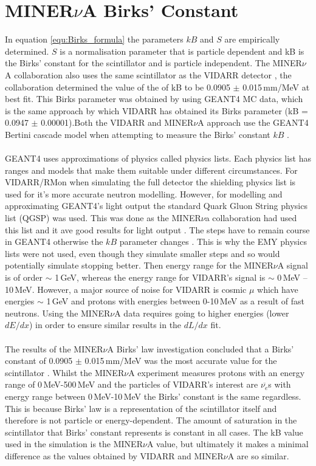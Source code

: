 \section{MINER$\nu$A Birks' Constant}\label{sec:GEANT4Simulation_MINERvABirksConstant}
In equation \ref{equ:Birks_formula} the parameters $kB$ and $S$ are empirically determined. $S$ is a normalisation parameter that is particle dependent and kB is the Birks' constant for the scintillator and is particle independent. The MINER$\nu$A collaboration \cite{aliaga_2015} also uses the same scintillator as the VIDARR detector \cite{aliaga_2014}, the collaboration determined the value of the of kB to be 0.0905 $\pm$ 0.015\,mm/MeV at best fit. This Birks parameter was obtained by using GEANT4 MC data, which is the same approach by which VIDARR has obtained its Birks parameter (kB = 0.0947 $\pm$ 0.00001).Both the VIDARR and MINER$\nu$A approach use the GEANT4 Bertini cascade model when attempting to measure the Birks' constant $kB$ \cite{Heikkinen_2003}. 
\\\\GEANT4 uses approximations of physics called physics lists. Each physics list has ranges and models that make them suitable under different circumstances. For VIDARR/RMon when simulating the full detector the shielding physics list is used for it's more accurate neutron modelling. However, for modelling and approximating GEANT4's light output the standard Quark Gluon String physics list (QGSP) was used. This was done as the MINER$\nu$a collaboration had used this list and it ave good results for light output \cite{Patrick_2018}. The steps have to remain course in GEANT4 otherwise the $kB$ parameter changes  \cite{aliaga_2015}. This is why the EMY physics lists were not used, even though they simulate smaller steps and so would potentially simulate stopping better. Then energy range for the MINER$\nu$A signal is of order $\sim$ 1\,GeV, whereas the energy range for VIDARR's signal is $\sim$ 0\,MeV -- 10\,MeV. However, a major source of noise for VIDARR is cosmic $\mu$ which have energies $\sim$ 1\,GeV and protons with energies between 0-10\,MeV as a result of fast neutrons. Using the MINER$\nu$A data requires going to higher energies (lower $dE/dx$) in order to ensure similar results in the $dL/dx$ fit.  
\\\\The results of the MINER$\nu$A Birks' law investigation concluded that a Birks' constant of 0.0905 $\pm$ 0.015\,mm/MeV was the most accurate value for the scintillator \cite{aliaga_2015}. Whilst the MINER$\nu$A experiment measures protons with an energy range of 0\,MeV-500\,MeV and the particles of VIDARR's interest are $\overline{\nu_{e}}$s with energy range between 0\,MeV-10\,MeV the Birks' constant is the same regardless. This is because Birks' law is a representation of the scintillator itself and therefore is not particle or energy-dependent. The amount of saturation in the scintillator that Birks' constant represents is constant in all cases. The kB value used in the simulation is the MINER$\nu$A value, but ultimately it makes a minimal difference as the values obtained by VIDARR and MINER$\nu$A are so similar. 
